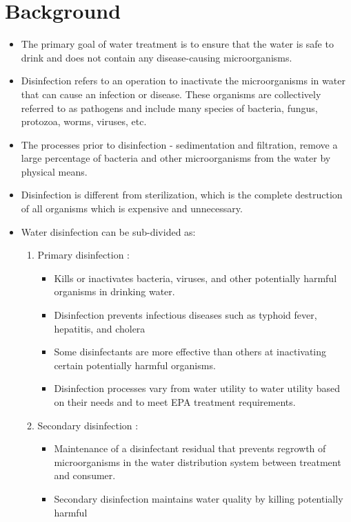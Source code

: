 \section{Background}
\begin{itemize}
\item The primary goal of water treatment is to ensure that the water is safe to drink and does not contain any disease-causing microorganisms. 
\item Disinfection refers to an operation to inactivate the microorganisms in water that can cause an infection or disease. These organisms are collectively referred to as pathogens and include many species of bacteria, fungus, protozoa, worms, viruses, etc.
\item The processes prior to disinfection - sedimentation and filtration, remove a large percentage of bacteria and other microorganisms from the water by physical means.
\item Disinfection is different from sterilization, which is the complete destruction of all organisms which is expensive and unnecessary.
\item Water disinfection can be sub-divided as:
\begin{enumerate}
\item Primary disinfection :
\begin{itemize}
\item Kills or inactivates bacteria, viruses, and other potentially harmful organisms in drinking water.
\item Disinfection prevents infectious diseases such as typhoid fever, hepatitis, and
cholera
\item Some disinfectants are more effective than others at inactivating certain
potentially harmful organisms.
\item Disinfection processes vary from water utility to water utility based on their
needs and to meet EPA treatment requirements.
\end{itemize}
\item Secondary disinfection :
\begin{itemize}
\item Maintenance of a disinfectant residual that prevents regrowth of microorganisms in the water distribution system between treatment and consumer.
\item Secondary disinfection maintains water quality by killing potentially harmful

\end{itemize}
\end{enumerate}
\end{itemize}
